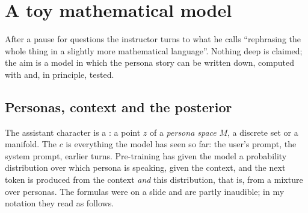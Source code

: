 
\section{A toy mathematical model}\label{sec:L7-toy}
After a pause for questions the instructor turns to what he calls ``rephrasing the whole thing in a slightly more mathematical language''. Nothing deep is claimed; the aim is a model in which the persona story can be written down, computed with and, in principle, tested.

\subsection{Personas, context and the posterior}\label{sec:L7-setup}
The assistant character is a : a point $z$ of a \emph{persona space} $M$, a discrete set or a manifold. The  $c$ is everything the model has seen so far: the user's prompt, the system prompt, earlier turns. Pre-training has given the model a probability distribution over which persona is speaking, given the context, and the next token is produced from the context \emph{and} this distribution, that is, from a mixture over personas. The formulas were on a slide and are partly inaudible; in my notation they read as follows.

